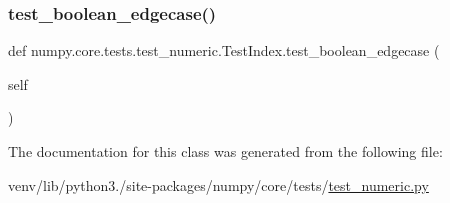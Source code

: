 \subsubsection{\texorpdfstring{test\+\_\+boolean\+\_\+edgecase()}{test\_boolean\_edgecase()}}
{\footnotesize\ttfamily def numpy.\+core.\+tests.\+test\+\_\+numeric.\+Test\+Index.\+test\+\_\+boolean\+\_\+edgecase (\begin{DoxyParamCaption}\item[{}]{self }\end{DoxyParamCaption})}



The documentation for this class was generated from the following file\+:\begin{DoxyCompactItemize}
\item 
venv/lib/python3./site-\/packages/numpy/core/tests/\hyperlink{core_2tests_2test__numeric_8py}{test\+\_\+numeric.\+py}\end{DoxyCompactItemize}
